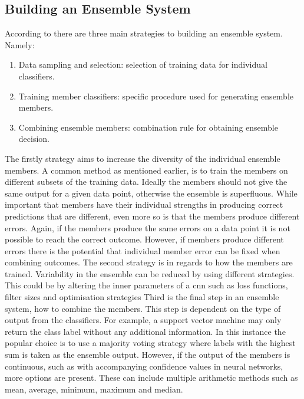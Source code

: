 \subsection{Building an Ensemble System}\label{sec:build_ensemble}
According to \cite{ensemblebook} there are three main strategies to building an ensemble system. Namely:

\begin{enumerate}
	\item Data sampling and selection: selection of training data for individual classifiers.
	\item Training member classifiers: specific procedure used for generating ensemble members.
	\item Combining ensemble members: combination rule for obtaining ensemble decision.
\end{enumerate}

The firstly strategy aims to increase the diversity of the individual ensemble members. A common method as mentioned earlier, is to train the members on different subsets of the training data. Ideally the members should not give the same output for a given data point, otherwise the ensemble is superfluous. While important that members have their individual strengths in producing correct predictions that are different, even more so is that the members produce different errors. Again, if the members produce the same errors on a data point it is not possible to reach the correct outcome. However, if members produce different errors there is the potential that individual member error can be fixed when combining outcomes. The second strategy is in regards to how the members are trained. Variability in the ensemble can be reduced by using different strategies. This could be by altering the inner parameters of a \gls{cnn} such as loss functions, filter sizes and optimisation strategies Third is the final step in an ensemble system, how to combine the members. This step is dependent on the type of output from the classifiers. For example, a support vector machine may only return the class label without any additional information. In this instance the popular choice is to use a majority voting strategy where labels with the highest sum is taken as the ensemble output. However, if the output of the members is continuous, such as with accompanying confidence values in neural networks, more options are present. These can include multiple arithmetic methods such as mean, average, minimum, maximum and median.

